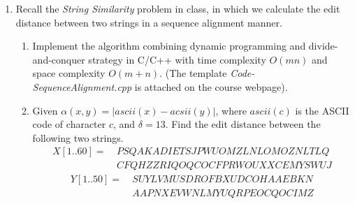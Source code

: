 \documentclass[12pt,a4paper]{article}
\theoremstyle{definition}
\begin{document}
\begin{enumerate}
    \item
    Recall the \emph{String Similarity} problem in class, in which we calculate the edit distance between two strings in a sequence alignment manner.
    \begin{enumerate}
        \item
        Implement the algorithm combining dynamic programming and divide-and-conquer strategy in C/C++ with time complexity $O(mn)$ and space complexity $O(m+n)$. {\color{blue}(The template \emph{Code-SequenceAlignment.cpp} is attached on the course webpage)}.
        
        \item
        Given $\alpha(x, y) = |ascii(x) - acsii(y)|$, where $ascii(c)$ is the ASCII code of character $c$, and $\delta=13$. Find the edit distance between the following two strings.
        \begin{align*}
        X[1..60]=&\ PSQAKADIETSJPWUOMZLNLOMOZNLTLQ\\
        &\ CFQHZZRIQOQCOCFPRWOUXXCEMYSWUJ
        \end{align*}
        \begin{align*}
        Y[1..50]=&\ SUYLVMUSDROFBXUDCOHAAEBKN\\
        &\ AAPNXEVWNLMYUQRPEOCQOCIMZ
        \end{align*}
        

\end{enumerate}
\end{enumerate}
\end{document}
